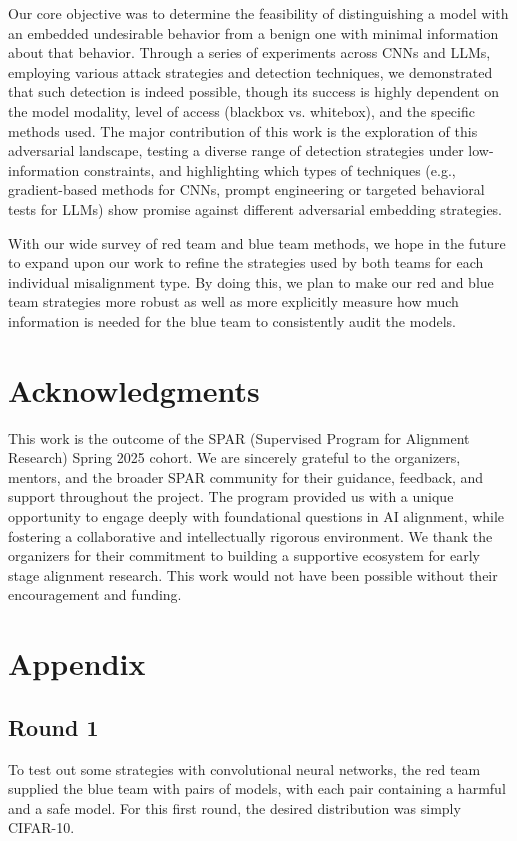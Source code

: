 \documentclass[letterpaper]{article} %
\begin{document}
Our core objective was to determine the feasibility of distinguishing a model with an embedded undesirable behavior from a benign one with minimal information about that behavior. Through a series of experiments across CNNs and LLMs, employing various attack strategies and detection techniques, we demonstrated that such detection is indeed possible, though its success is highly dependent on the model modality, level of access (blackbox vs. whitebox), and the specific methods used. The major contribution of this work is the exploration of this adversarial landscape, testing a diverse range of detection strategies under low-information constraints, and highlighting which types of techniques (e.g., gradient-based methods for CNNs, prompt engineering or targeted behavioral tests for LLMs) show promise against different adversarial embedding strategies.

With our wide survey of red team and blue team methods, we hope in the future to expand upon our work to refine the strategies used by both teams for each individual misalignment type. By doing this, we plan to make our red and blue team strategies more robust as well as more explicitly measure how much information is needed for the blue team to consistently audit the models.

\section{Acknowledgments}
This work is the outcome of the SPAR (Supervised Program for Alignment Research) Spring 2025 cohort. We are sincerely grateful to the organizers, mentors, and the broader SPAR community for their guidance, feedback, and support throughout the project. The program provided us with a unique opportunity to engage deeply with foundational questions in AI alignment, while fostering a collaborative and intellectually rigorous environment. We thank the organizers for their commitment to building a supportive ecosystem for early stage alignment research. This work would not have been possible without their encouragement and funding.

\clearpage

\section{Appendix}

\subsection*{Round 1}
To test out some strategies with convolutional neural networks, the red team supplied the blue team with pairs of models, with each pair containing a harmful and a safe model. For this first round, the desired distribution was simply CIFAR-10.
\end{document}
